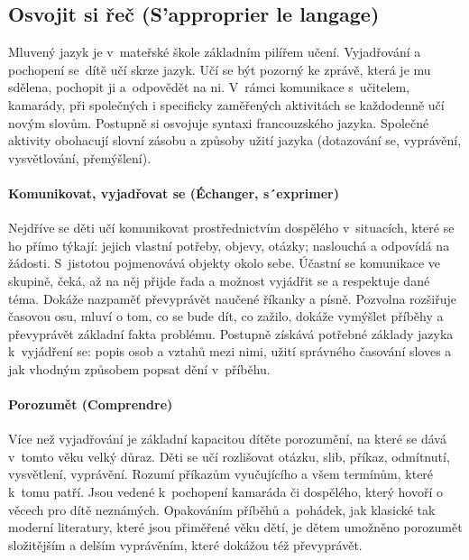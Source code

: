 		\subsection{Osvojit si řeč (S'approprier le langage)}
			Mluvený jazyk je v mateřské škole základním pilířem učení. Vyjadřování a pochopení se dítě učí skrze jazyk. Učí se být pozorný ke zprávě, která je mu sdělena, pochopit ji a odpovědět na ni. V rámci komunikace s učitelem, kamarády, při společných i specificky zaměřených aktivitách se každodenně učí novým slovům. Postupně si osvojuje syntaxi francouzského jazyka. Společné aktivity obohacují slovní zásobu a způsoby užití jazyka (dotazování se, vyprávění, vysvětlování, přemýšlení).

			\paragraph{Komunikovat, vyjadřovat se (Échanger, s´exprimer)}

			Nejdříve se děti učí komunikovat prostřednictvím dospělého v situacích, které se ho přímo týkají: jejich vlastní potřeby, objevy, otázky; naslouchá a odpovídá na žádosti. S jistotou pojmenovává objekty okolo sebe. Účastní se komunikace ve skupině, čeká, až na něj přijde řada a možnost vyjádřit se a respektuje dané téma. Dokáže nazpaměť převyprávět naučené říkanky a písně. Pozvolna rozšiřuje časovou osu, mluví o tom, co se bude dít, co zažilo, dokáže vymýšlet příběhy a převyprávět základní fakta problému. Postupně získává potřebné základy jazyka k vyjádření se: popis osob a vztahů mezi nimi, užití správného časování sloves a jak vhodným způsobem popsat dění v příběhu.

			\paragraph{Porozumět (Comprendre)}
			Více než vyjadřování je základní kapacitou dítěte porozumění, na které se dává v tomto věku velký důraz.
			Děti se učí rozlišovat otázku, slib, příkaz, odmítnutí, vysvětlení, vyprávění. Rozumí příkazům vyučujícího a všem termínům, které k tomu patří. Jsou vedené k pochopení kamaráda či dospělého, který hovoří o věcech pro dítě neznámých. Opakováním příběhů a pohádek, jak klasické tak moderní literatury, které jsou přiměřené věku dětí, je dětem umožněno porozumět složitějším a delším vyprávěním, které dokážou též převyprávět. 

